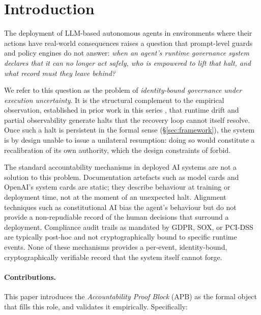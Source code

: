 \documentclass[11pt]{article}
\newcommand{\APB}{\mathrm{APB}}
\begin{document}
\section{Introduction}
\label{sec:intro}

The deployment of LLM-based autonomous agents in environments where their
actions have real-world consequences raises a question that prompt-level
guards and policy engines do not answer: \emph{when an agent's runtime
governance system declares that it can no longer act safely, who is
empowered to lift that halt, and what record must they leave behind?}

We refer to this question as the problem of \emph{identity-bound
governance under execution uncertainty}. It is the structural complement
to the empirical observation, established in prior work in this series
\citep{fernandez2026applied}, that runtime drift and partial observability
generate halts that the recovery loop cannot itself resolve. Once such a
halt is persistent in the formal sense (\S\ref{sec:framework}), the system
is by design unable to issue a unilateral resumption: doing so would
constitute a recalibration of its own authority, which the design
constraints of \citep{fernandez2026applied} forbid.

The standard accountability mechanisms in deployed AI systems are not a
solution to this problem. Documentation artefacts such as model cards
\citep{mitchell2019model} and OpenAI's system cards
\citep{openai2024systemcard} are static; they describe behaviour at training
or deployment time, not at the moment of an unexpected halt. Alignment
techniques such as constitutional AI \citep{bai2022constitutional} bias the
agent's behaviour but do not provide a non-repudiable record of the
human decisions that surround a deployment. Compliance audit trails as
mandated by GDPR, SOX, or PCI-DSS are typically post-hoc and not
cryptographically bound to specific runtime events. None of these
mechanisms provides a per-event, identity-bound, cryptographically
verifiable record that the system itself cannot forge.

\paragraph{Contributions.}
This paper introduces the \emph{Accountability Proof Block} ($\APB$) as
the formal object that fills this role, and validates it empirically.
Specifically:
\end{document}
